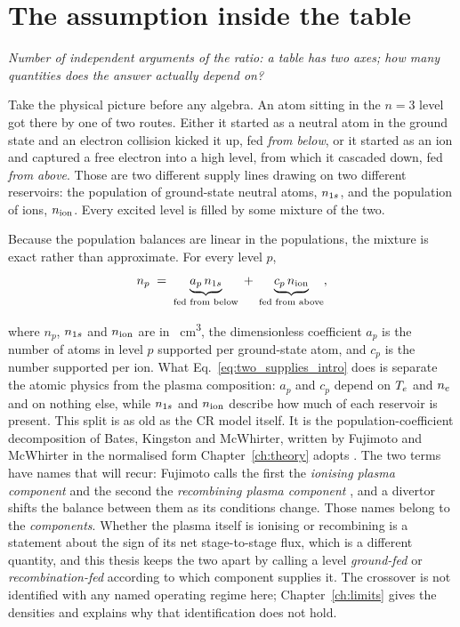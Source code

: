 \section{The assumption inside the table}
\label{sec:the_assumption}

\emph{Number of independent arguments of the ratio: a table has two axes; how many quantities does the answer
actually depend on?}

Take the physical picture before any algebra. An atom sitting in the $n=3$ level
got there by one of two routes. Either it started as a neutral atom in the ground
state and an electron collision kicked it up, fed \emph{from below}, or it
started as an ion and captured a free electron into a high level, from which it
cascaded down, fed \emph{from above}. Those are two different supply lines
drawing on two different reservoirs: the population of ground-state neutral
atoms, $n_{1s}$, and the population of ions, $n_{\mathrm{ion}}$. Every excited level is
filled by some mixture of the two.

Because the population balances are linear in the populations, the mixture is
exact rather than approximate. For every level $p$,
\begin{equation}
  n_p \;=\; \underbrace{a_p\,n_{1s}}_{\text{fed from below}}
        \;+\; \underbrace{c_p\,n_{\mathrm{ion}}}_{\text{fed from above}},
  \label{eq:two_supplies_intro}
\end{equation}

\noindent where $n_p$, $n_{1s}$ and $n_{\mathrm{ion}}$ are in \si{\per\cubic\centi\metre},
the dimensionless coefficient $a_p$ is the number of atoms in level $p$ supported
per ground-state atom, and $c_p$ is the number supported per ion. What
Eq.~\eqref{eq:two_supplies_intro} does is separate the atomic physics from the
plasma composition: $a_p$ and $c_p$ depend on $T_e$ and $n_e$ and on nothing
else, while $n_{1s}$ and $n_{\mathrm{ion}}$ describe how much of each reservoir is present.
This split is as old as the CR model itself. It is the population-coefficient
decomposition of Bates, Kingston and McWhirter, written by Fujimoto and McWhirter
in the normalised form Chapter~\ref{ch:theory} adopts
\cite{Bates1962, FujimotoMcWhirter1990, Fujimoto2004}. The two terms have names
that will recur: Fujimoto calls the first the \emph{ionising plasma component}
and the second the \emph{recombining plasma component}
\cite[Sec.~4.1]{Fujimoto2004}, and a divertor shifts the balance between them as
its conditions change. Those names belong to the \emph{components}. Whether the
plasma itself is ionising or recombining is a statement about the sign of its
net stage-to-stage flux, which is a different quantity, and this thesis keeps
the two apart by calling a level \emph{ground-fed} or \emph{recombination-fed}
according to which component supplies it. The crossover is
not identified with any named operating regime here; Chapter~\ref{ch:limits}
gives the densities and explains why that identification does not hold.

